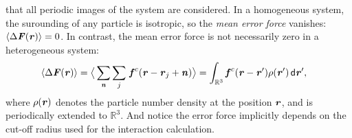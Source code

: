 \documentclass[aps,pre,preprint]{revtex4-1}
\renewcommand{\v}[1]{\textbf{\textit{#1}}}
\renewcommand{\d}[1]{\textsf{#1}}
\begin{document}
that all periodic images of the system are considered. In a
homogeneous system, the surounding of any particle is isotropic, so
the \emph{mean error force} vanishes: $\langle\Delta\v F(\v r)\rangle
= 0$. In contrast, the mean error force is not necessarily zero in a
heterogeneous system:
\begin{align} \label{eqn:tmp3} %
  \langle\Delta\v F(\v r)\rangle
  &=
  \big\langle
  \sum_{\v n}\sum_{j}\, \v f^c(\v r - \v r_j + \v n)
  \big\rangle 
  =
  \int_{\mathbb R^3}\v f^c(\v r - \v r')\rho(\v r')\,\d d\v r',
\end{align}
where $\rho(\v r)$ denotes the particle number density at the position
$\v r$, and is periodically extended to $\mathbb R^3$. And notice the
error force implicitly depends on the cut-off radius used for the
interaction calculation.
\end{document}
